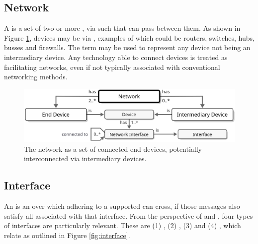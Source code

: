 \subsection{Network}
\label{sec:concepts:network}

A  is a set of two or more ,  via  such that  can pass between them.
As shown in Figure \ref{fig:network}, devices may be  via , examples of which could be routers, switches, hubs, busses and firewalls.
The term  may be used to represent any device not being an intermediary device.
Any technology able to connect devices is treated as facilitating networks, even if not typically associated with conventional networking methods.

\begin{figure}[ht!]
  \centering
  \includegraphics[scale=0.9]{figures/network}
  \caption{
    The network as a set of connected end devices, potentially interconnected via intermediary devices.
  }
  \label{fig:network}
\end{figure}

\vspace*{-4mm}

\subsection{Interface}
\label{sec:concepts:interface}

An  is an   over which  adhering to a supported  can cross, if those messages also satisfy all  associated with that interface.
From the perspective of   and , four types of interfaces are particularly relevant.
These are (1) , (2) , (3)  and (4) , which relate as outlined in Figure \ref{fig:interface}.

